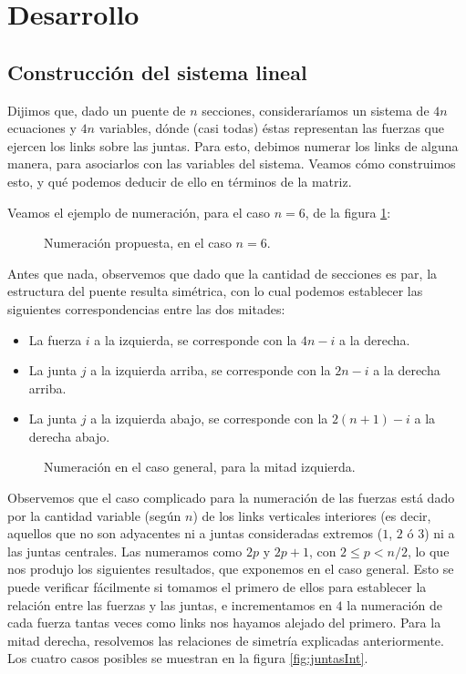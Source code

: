 \section{Desarrollo}
	\subsection{Construcción del sistema lineal}
	Dijimos que, dado un puente de $n$ secciones, consideraríamos un sistema de $4n$ ecuaciones y $4n$ variables, dónde (casi todas) éstas representan las fuerzas que ejercen los links sobre las juntas. Para esto, debimos numerar los links de alguna manera, para asociarlos con las variables del sistema. Veamos cómo construimos esto, y qué podemos deducir de ello en términos de la matriz.

Veamos el ejemplo de numeración, para el caso $n = 6$, de la figura \ref{fig:numeracion}:
\begin{figure}[!ht]

\caption{Numeración propuesta, en el caso $n = 6$.}
\label{fig:numeracion}
\end{figure}

Antes que nada, observemos que dado que la cantidad de secciones es par, la estructura del puente resulta simétrica, con lo cual podemos establecer las siguientes correspondencias entre las dos mitades:
\begin{itemize}
	\item La fuerza $i$ a la izquierda, se corresponde con la $4n-i$ a la derecha.
	\item La junta $j$ a la izquierda arriba, se corresponde con la $2n-i$ a la derecha arriba.
	\item La junta $j$ a la izquierda abajo, se corresponde con la $2(n+1)-i$ a la derecha abajo.
\end{itemize}

\begin{figure}[!ht]\begin{center}

\caption{Numeración en el caso general, para la mitad izquierda.}
\label{fig:mediaNumeracion}
\end{center}
\end{figure}

Observemos que el caso complicado para la numeración de las fuerzas está dado por la cantidad variable (según $n$) de los links verticales interiores (es decir, aquellos que no son adyacentes ni a juntas consideradas extremos ($1$, $2$ ó $3$) ni a las juntas centrales. Las numeramos como $2p$ y $2p+1$, con $2 \leq p < n/2$, lo que nos produjo los siguientes resultados, que exponemos en el caso general. Esto se puede verificar fácilmente si tomamos el primero de ellos para establecer la relación entre las fuerzas y las juntas, e incrementamos en $4$ la numeración de cada fuerza tantas veces como links nos hayamos alejado del primero. Para la mitad derecha, resolvemos las relaciones de simetría explicadas anteriormente. Los cuatro casos posibles se muestran en la figura \ref{fig:juntasInt}.

